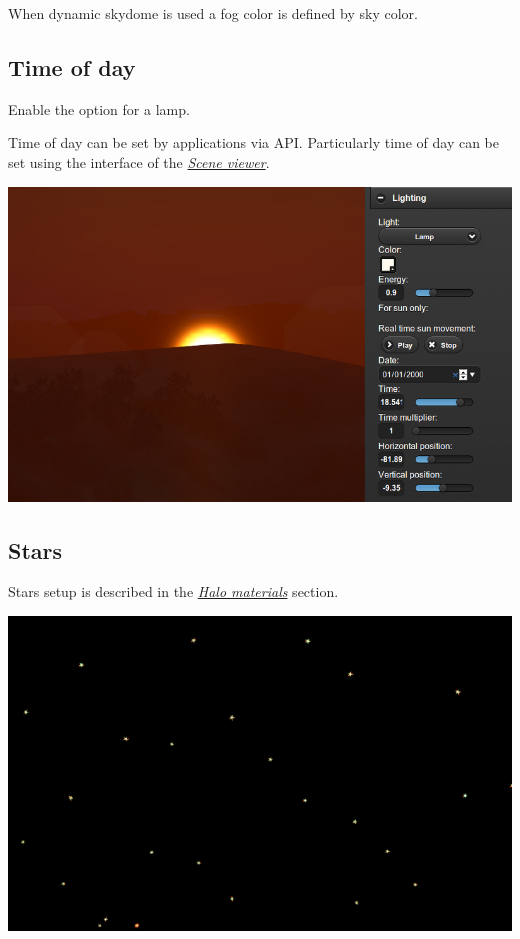 \documentclass[a4paper,12pt,oneside]{sphinxmanual}
\begin{document}
When dynamic skydome is used a fog color is defined by sky color.


\subsection{Time of day}
\label{outdoor_rendering:id28}
Enable the  option for a lamp.

Time of day can be set by applications via API. Particularly time of day can be set using the  interface of the {\hyperref[viewer:viewer]{\emph{Scene viewer}}}.

{\hfill\includegraphics[width=1.000\linewidth]{sunset.jpg}\hfill}


\subsection{Stars}
\label{outdoor_rendering:id29}
Stars setup is described in the {\hyperref[materials:material-halo]{\emph{Halo materials}}} section.

{\hfill\includegraphics[width=1.000\linewidth]{stars.jpg}\hfill}
\end{document}
